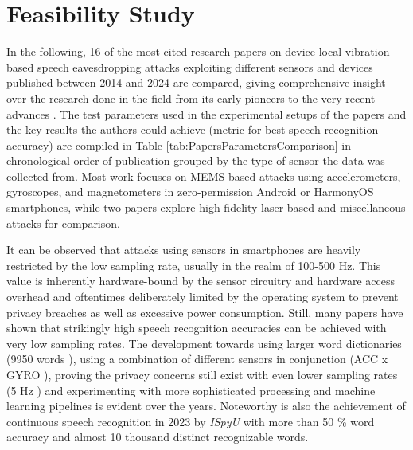 \documentclass[sigconf, nonacm]{acmart}
\begin{document}
\section{Feasibility Study}
\begin{sloppypar}
In the following, 16 of the most cited research papers on device-local vibration-based speech eavesdropping attacks exploiting different sensors and devices published between 2014 and 2024 are compared, giving comprehensive insight over the research done in the field from its early pioneers to the very recent advances \cite{Gyrophone2014}\cite{AccelWorld2015}\cite{PitchIn2017}\cite{Speechless2018}\cite{KineticSongComprehension2019}\cite{AccelEve2020}\cite{Spearphone2021}\cite{Vibphone2021}\cite{AccMyrinx2022}\cite{InertiEAR2022}\cite{ISpyU2023}\cite{VoiceListener2023}\cite{StealthyIMU2023}\cite{WatchTheRhythm2024}\cite{LidarPhone2020}\cite{HardDriveOfHearing2019}.
The test parameters used in the experimental setups of the papers and the key results the authors could achieve (metric for best speech recognition accuracy) are compiled in Table \ref{tab:PapersParametersComparison} in chronological order of publication grouped by the type of sensor the data was collected from.
Most work focuses on MEMS-based attacks using accelerometers, gyroscopes, and magnetometers in zero-permission Android or HarmonyOS smartphones, while two papers explore high-fidelity laser-based and miscellaneous attacks for comparison.
\end{sloppypar}
It can be observed that attacks using sensors in smartphones are heavily restricted by the low sampling rate, usually in the realm of 100-500 Hz.
This value is inherently hardware-bound by the sensor circuitry and hardware access overhead and oftentimes deliberately limited by the operating system to prevent privacy breaches as well as excessive power consumption.
Still, many papers have shown that strikingly high speech recognition accuracies can be achieved with very low sampling rates.
The development towards using larger word dictionaries (9950 words \cite{ISpyU2023}), using a combination of different sensors in conjunction (ACC x GYRO \cite{InertiEAR2022}), proving the privacy concerns still exist with even lower sampling rates (5 Hz \cite{WatchTheRhythm2024}) and experimenting with more sophisticated processing and machine learning pipelines is evident over the years.
Noteworthy is also the achievement of continuous speech recognition in 2023 by \textit{ISpyU} \cite{ISpyU2023} with more than 50 \% word accuracy and almost 10 thousand distinct recognizable words.
\end{document}
